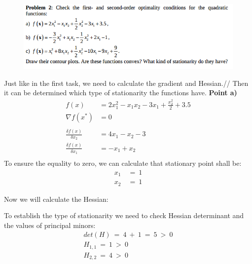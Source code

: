 \documentclass[eng,openany]{mgr}
\begin{document}
\begin{figure}[h]
	\centering
	\includegraphics[width=0.7\linewidth]{screenshot003}
	\label{fig:screenshot003}
\end{figure}
Just like in the first task, we need to calculate the gradient and Hessian.//
Then it can be determined which type of stationarity the functions have.
\textbf{Point a)}
\\
\begin{align*}
f(x) &= 2 x_{1}^{2} - x_{1} x_{2} - 3 x_{1} + \frac{x_{2}^{2}}{2} + 3.5\\
\nabla f(x^*) &= 0\\ \\
\frac{\delta f(x)}{\delta x_2} &= 4 x_{1} - x_{2} - 3
\\
\frac{\delta f(x)}{\delta x_1} &= - x_{1} + x_{2}
\\
\end{align*}
To ensure the equality to zero, we can calculate that stationary point shall be:
\begin{align*}
x_1\ &=\ 1\\
x_2\ &=\ 1
\end{align*}

Now we will calculate the Hessian:
To establish the type of stationarity we need to check Hessian determinant and the values of principal minors:
\begin{align*}
det(H)\ =\ 4\ +\ 1\ =\ 5\ >\ 0\\
H_{1,1}\ =\ 1\ >\ 0\\
H_{2,2}\ =\ 4\ >\ 0\\
\end{align*}
\end{document}
